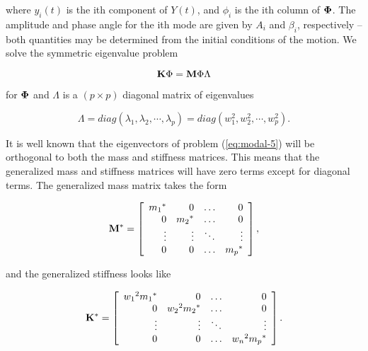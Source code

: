 \vspace{0.15 in}\noindent
where $y_i (t)$ is the ith component of $Y(t)$,
and $\phi_i$ is the ith column of ${\bf \Phi}$.
The amplitude and phase angle for the ith mode are
given by $A_i$ and $\beta_i$, respectively --
both quantities may be determined from
the initial conditions of the motion.
We solve the symmetric eigenvalue problem

\begin{equation}
{\bf K} \Phi = {\bf M} \Phi \Lambda
\label{eq:modal-6}
\end{equation}

\vspace{0.15 in}\noindent
for ${\bf \Phi}$ and
$\Lambda$ is a $(p \times p)$ diagonal matrix of eigenvalues

\begin{equation}
\Lambda = diag(\lambda_1, \lambda_2, \cdots, \lambda_p) = diag( w_1^2, w_2^2, \cdots, w_p^2 ).
\label{eq:modal-7}
\end{equation}

\vspace{0.15 in}\noindent
It is well known that the eigenvectors of problem (\ref{eq:modal-5})
will be orthogonal to both the mass and stiffness matrices.
This means that the generalized mass and stiffness matrices will
have zero terms except for diagonal terms.
The generalized mass matrix takes the form

\begin{equation}
{\bf M^*} = \left[
\begin{array}{rrrr}
{m_1}^* &       0 &   \ldots    &     0   \\
      0 &  {m_2}^*&   \ldots    &     0   \\
 \vdots &   \vdots&   \ddots    & \vdots  \\
      0 &        0&   \ldots    & {m_p}^* \\
\end{array}
\right],
\label{eq:uncoupled-1}
\end{equation}

\vspace{0.05 in}\noindent
and the generalized stiffness looks like

\begin{equation}
{\bf K^*} = \left[
\begin{array}{rrrr}
          {w_1}^2 {m_1}^*&0&\ldots&0     \\
          0& {w_2}^2 {m_2}^*&\ldots&0    \\
          \vdots&\vdots&\ddots&\vdots    \\
          0&0&\ldots&{w_n}^2 {m_p}^*     \\
\end{array}
\right].
\label{eq:uncoupled-2}
\end{equation}

